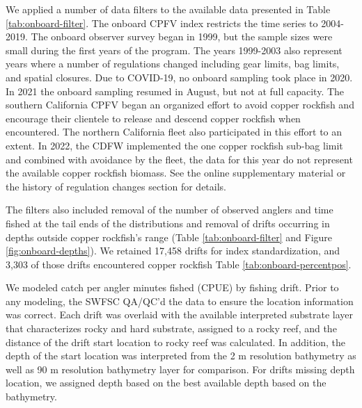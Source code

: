 \documentclass[11pt,
  english,
  letterpaper,
]{article}
\begin{document}
We applied a number of data filters to the available data presented in Table \ref{tab:onboard-filter}. The onboard CPFV index restricts the time series to 2004-2019. The onboard observer survey began in 1999, but the sample sizes were small during the first years of the program. The years 1999-2003 also represent years where a number of regulations changed including gear limits, bag limits, and spatial closures. Due to COVID-19, no onboard sampling took place in 2020. In 2021 the onboard sampling resumed in August, but not at full capacity. The southern California CPFV began an organized effort to avoid copper rockfish and encourage their clientele to release and descend copper rockfish when encountered. The northern California fleet also participated in this effort to an extent. In 2022, the CDFW implemented the one copper rockfish sub-bag limit and combined with avoidance by the fleet, the data for this year do not represent the available copper rockfish biomass. See the online supplementary material or the history of regulation changes section for details.

The filters also included removal of the number of observed anglers and time fished at the tail ends of the distributions and removal of drifts occurring in depths outside copper rockfish's range (Table \ref{tab:onboard-filter} and Figure \ref{fig:onboard-depths}). We retained 17,458 drifts for index standardization, and 3,303 of those drifts encountered copper rockfish Table \ref{tab:onboard-percentpos}.

We modeled catch per angler minutes fished (CPUE) by fishing drift. Prior to any modeling, the SWFSC QA/QC'd the data to ensure the location information was correct. Each drift was overlaid with the available interpreted substrate layer that characterizes rocky and hard substrate, assigned to a rocky reef, and the distance of the drift start location to rocky reef was calculated. In addition, the depth of the start location was interpreted from the 2 m resolution bathymetry as well as 90 m resolution bathymetry layer for comparison. For drifts missing depth location, we assigned depth based on the best available depth based on the bathymetry.
\end{document}
